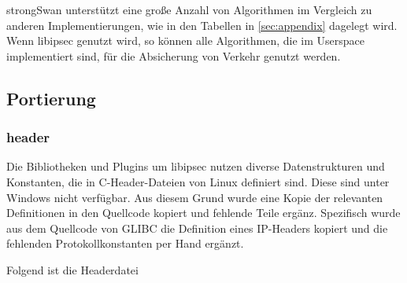 strongSwan unterstützt eine große Anzahl von Algorithmen im Vergleich zu anderen Implementierungen,
wie in den Tabellen in \autoref{sec:appendix} dagelegt wird. Wenn libipsec genutzt wird,
so können alle Algorithmen, die im Userspace implementiert sind, für die Absicherung
von Verkehr genutzt werden.

\subsection{Portierung}
\subsubsection{header}
Die Bibliotheken und Plugins um libipsec nutzen diverse Datenstrukturen und Konstanten,
die in C-Header-Dateien von Linux definiert sind. Diese sind unter Windows nicht verfügbar.
Aus diesem Grund wurde eine Kopie der relevanten Definitionen in den Quellcode kopiert
und fehlende Teile ergänz.
Spezifisch wurde aus dem Quellcode von GLIBC die Definition eines \ac{IP}-Headers kopiert
und die fehlenden Protokollkonstanten per Hand ergänzt.

Folgend ist die Headerdatei

